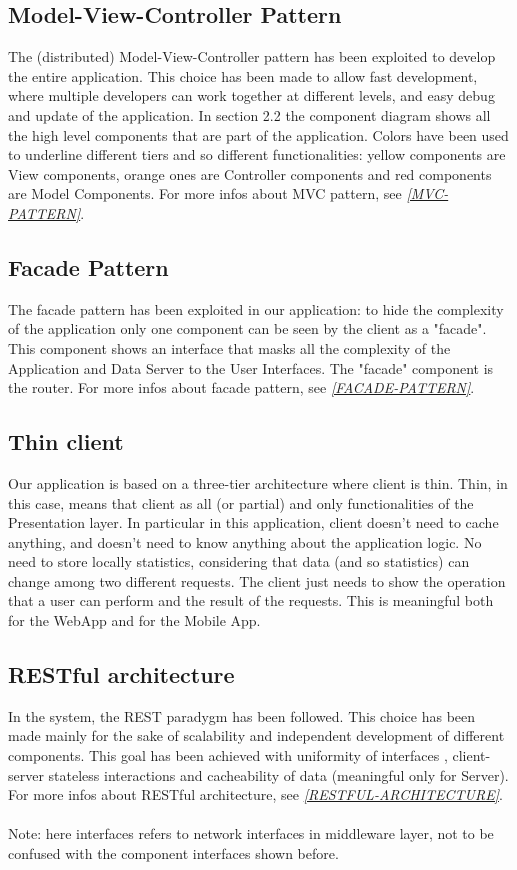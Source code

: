\documentclass[a4paper]{report}
\begin{document}
\subsection{Model-View-Controller Pattern}
The (distributed) Model-View-Controller pattern has been exploited to develop the entire application.  This choice has been made to allow fast development, where multiple developers can work together at different levels, and easy debug and update of the application. In section 2.2 the component diagram shows all the high level components that are part of the application. Colors have been used to underline different tiers and so different functionalities: yellow components are View components, orange ones are Controller components and red components are Model Components. For more infos about MVC pattern, see \hyperref[use:MVC-pattern]{\textit{[MVC-PATTERN]}}.
\subsection{Facade Pattern}
The facade pattern has been exploited in our application: to hide the complexity of the application only one component can be seen by the client as a "facade". This component shows an interface that masks all the complexity of the Application and Data Server to the User Interfaces. The "facade" component is the router. For more infos about facade pattern, see \hyperref[ref:facade-pattern]{\textit{[FACADE-PATTERN]}}.
\subsection{Thin client}
Our application is based on a three-tier architecture where client is thin. Thin, in this case, means that client as all (or partial) and only functionalities of the Presentation layer. In particular in this application, client doesn't need to cache anything, and doesn't need to know anything about the application logic. No need to store locally statistics, considering that data (and so statistics) can change among two different requests. The client just needs to show the operation that a user can perform and the result of the requests. This is meaningful both for the WebApp and for the Mobile App. 
\subsection{RESTful architecture}
In the system, the REST paradygm has been followed. This choice has been made mainly for the sake of scalability and independent development of different components. This goal has been achieved with uniformity of interfaces , client-server stateless interactions and cacheability of data (meaningful only for Server). For more infos about RESTful architecture, see \hyperref[use:RESTful-architecture]{\textit{[RESTFUL-ARCHITECTURE]}}. \\
\\
Note: here interfaces refers to network interfaces in middleware layer, not to be confused with the component interfaces shown before.
\end{document}
